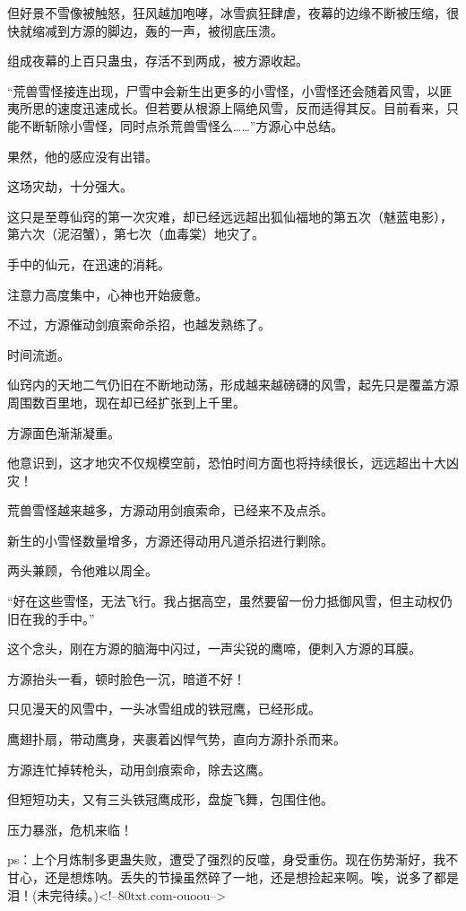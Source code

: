 \begin{this_body}
但好景不雪像被触怒，狂风越加咆哮，冰雪疯狂肆虐，夜幕的边缘不断被压缩，很快就缩减到方源的脚边，轰的一声，被彻底压溃。

组成夜幕的上百只蛊虫，存活不到两成，被方源收起。

“荒兽雪怪接连出现，尸雪中会新生出更多的小雪怪，小雪怪还会随着风雪，以匪夷所思的速度迅速成长。但若要从根源上隔绝风雪，反而适得其反。目前看来，只能不断斩除小雪怪，同时点杀荒兽雪怪么……”方源心中总结。

果然，他的感应没有出错。

这场灾劫，十分强大。

这只是至尊仙窍的第一次灾难，却已经远远超出狐仙福地的第五次（魅蓝电影），第六次（泥沼蟹），第七次（血毒棠）地灾了。

手中的仙元，在迅速的消耗。

注意力高度集中，心神也开始疲惫。

不过，方源催动剑痕索命杀招，也越发熟练了。

时间流逝。

仙窍内的天地二气仍旧在不断地动荡，形成越来越磅礴的风雪，起先只是覆盖方源周围数百里地，现在却已经扩张到上千里。

方源面色渐渐凝重。

他意识到，这才地灾不仅规模空前，恐怕时间方面也将持续很长，远远超出十大凶灾！

荒兽雪怪越来越多，方源动用剑痕索命，已经来不及点杀。

新生的小雪怪数量增多，方源还得动用凡道杀招进行剿除。

两头兼顾，令他难以周全。

“好在这些雪怪，无法飞行。我占据高空，虽然要留一份力抵御风雪，但主动权仍旧在我的手中。”

这个念头，刚在方源的脑海中闪过，一声尖锐的鹰啼，便刺入方源的耳膜。

方源抬头一看，顿时脸色一沉，暗道不好！

只见漫天的风雪中，一头冰雪组成的铁冠鹰，已经形成。

鹰翅扑扇，带动鹰身，夹裹着凶悍气势，直向方源扑杀而来。

方源连忙掉转枪头，动用剑痕索命，除去这鹰。

但短短功夫，又有三头铁冠鹰成形，盘旋飞舞，包围住他。

压力暴涨，危机来临！

ps：上个月炼制多更蛊失败，遭受了强烈的反噬，身受重伤。现在伤势渐好，我不甘心，还是想炼呐。丢失的节操虽然碎了一地，还是想捡起来啊。唉，说多了都是泪！(未完待续。)<!--80txt.com-ouoou-->

\end{this_body}

